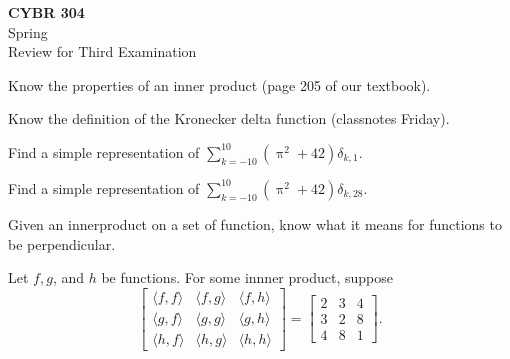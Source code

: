 \documentclass[12pt,fleqn,answers]{exam}
\begin{document}
\begin{flushleft}

{\bf CYBR 304} \\
   Spring \the\year\\
  Review for Third Examination
\end{flushleft}




\begin{questions}

\item Know the properties of an inner product (page 205 of our textbook).

\item Know the definition of the Kronecker delta function (classnotes Friday).

\item Find a simple representation of $\displaystyle \sum_{k=-10}^{10} \left(\uppi^2 + 42\right) \delta_{k,1}$.

\item Find a simple representation of $\displaystyle \sum_{k=-10}^{10} \left(\uppi^2 + 42\right) \delta_{k,28}$.

\item Given an innerproduct on a set of function, know what it means for functions to be perpendicular.

\item Let $f,g$, and $h$ be functions. For some innner product, suppose
\begin{equation}
\begin{bmatrix}
\langle f,f \rangle & \langle f,g \rangle & \langle f,h \rangle \\
\langle g,f \rangle & \langle g,g \rangle & \langle g,h \rangle \\
\langle h,f \rangle & \langle h,g \rangle & \langle h,h \rangle 
\end{bmatrix} = 
\begin{bmatrix} 2 & 3 & 4 \\
                        3 & 2 & 8 \\
                        4 & 8 & 1
\end{bmatrix}.
\end{equation}
\end{questions}
\end{document}
